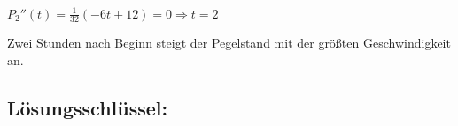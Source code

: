 \begin{langesbeispiel}
\begin{loesung}
{	$P_2''(t)=\frac{1}{32}(-6t+12)=0 \Rightarrow t=2$
	
	Zwei Stunden nach Beginn steigt der Pegelstand mit der größten Geschwindigkeit an.
} %

\setcounter{subitemcounter}{0}
\subsection{Lösungsschlüssel:}
 

\end{loesung}

\end{langesbeispiel}
